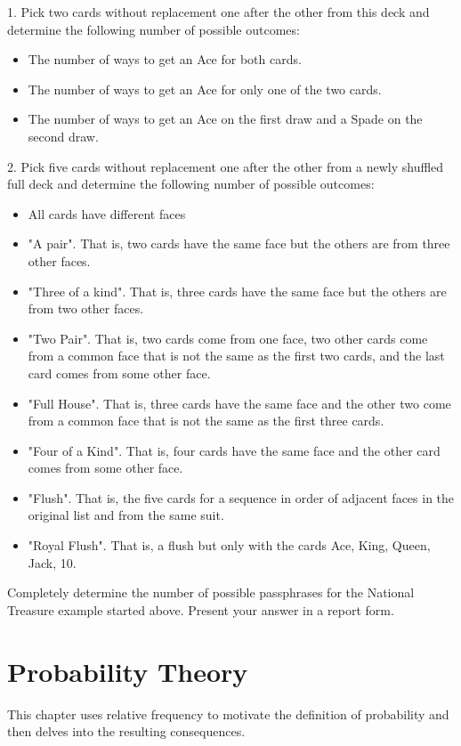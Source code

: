 \documentclass[10pt,]{book}
\theoremstyle{plain}
\theoremstyle{definition}
\theoremstyle{definition}
\theoremstyle{definition}
\numberwithin{equation}{section}
\begin{document}
1.  Pick two cards without replacement one after the other from this deck and determine the following number of possible outcomes:
\leavevmode%
\begin{itemize}[label=\textbullet]
\item{}The number of ways to get an Ace for both cards.%
\item{}The number of ways to get an Ace for only one of the two cards.%
\item{}The number of ways to get an Ace on the first draw and a Spade on the second draw.%
\end{itemize}

2.  Pick five cards without replacement one after the other from a newly shuffled full deck and determine the following number of possible outcomes:
\leavevmode%
\begin{itemize}[label=\textbullet]
\item{}All cards have different faces%
\item{}"A pair". That is, two cards have the same face but the others are from three other faces.%
\item{}"Three of a kind".  That is, three cards have the same face but the others are from two other faces.%
\item{}"Two Pair". That is, two cards come from one face, two other cards come from a common face that is not the same as the first two cards, and the last card comes from some other face.%
\item{}"Full House". That is, three cards have the same face and the other two come from a common face that is not the same as the first three cards.%
\item{}"Four of a Kind". That is, four cards have the same face and the other card comes from some other face.%
\item{}"Flush". That is, the five cards for a sequence in order of adjacent faces in the original list and from the same suit.%
\item{}"Royal Flush". That is, a flush but only with the cards {Ace, King, Queen, Jack, 10}.%
\end{itemize}

%
\par
Completely determine the number of possible passphrases for the National Treasure example started above. Present your answer in a report form.%
\typeout{************************************************}
\typeout{************************************************}
\chapter[{Probability Theory}]{Probability Theory}\label{ProbabilityGeneralities}
\typeout{************************************************}
\typeout{************************************************}
This chapter uses relative frequency to motivate the definition of probability and then delves into the resulting consequences.%
\typeout{************************************************}
\typeout{************************************************}
\end{document}
